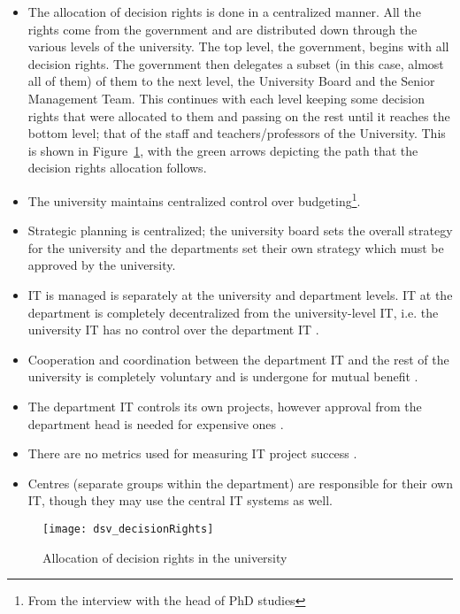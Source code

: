 \begin{itemize}
\item The allocation of decision rights is done in a centralized manner. All the rights come from the government and are distributed down through the various levels of the university. The top level, the government, begins with all decision rights. The government then delegates a subset (in this case, almost all of them) of them to the next level, the University Board and the Senior Management Team. This continues with each level keeping some decision rights that were allocated to them and passing on the rest until it reaches the bottom level; that of the staff and teachers/professors of the University. This is shown in Figure~\ref{fig:dsv_decisionRights}, with the green arrows depicting the path that the decision rights allocation follows.
\item The university maintains centralized control over budgeting\footnote{From the interview with the head of PhD studies\label{fn:interviewPHD}}.
\item Strategic planning is centralized; the university board sets the overall strategy for the university and the departments set their own strategy which must be approved by the university.
\item IT is managed is separately at the university and department levels. IT at the department is completely decentralized from the university-level IT, i.e. the university IT has no control over the department IT .  
\item Cooperation and coordination between the department IT and the rest of the university is completely voluntary and is undergone for mutual benefit . 
\item The department IT controls its own projects, however approval from the department head is needed for expensive ones . 
\item There are no metrics used for measuring IT project success . 
\item Centres (separate groups within the department) are responsible for their own IT, though they may use the central IT systems as well.
\end{itemize}

\begin{figure}
\texttt{[image: dsv\_decisionRights]}
\caption{Allocation of decision rights in the university}
\label{fig:dsv_decisionRights}
\end{figure}

